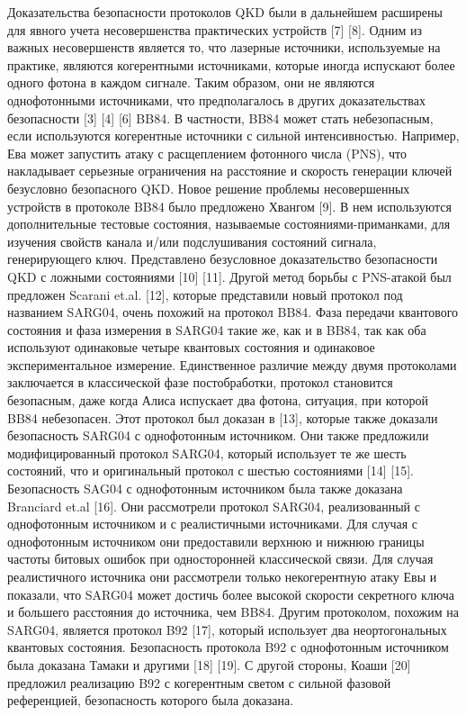 Доказательства безопасности протоколов QKD были в дальнейшем расширены для явного учета несовершенства практических устройств [7] [8]. Одним из важных несовершенств является то, что лазерные источники, используемые на практике, являются когерентными источниками, которые иногда испускают более одного фотона в каждом сигнале. Таким образом, они не являются однофотонными источниками, что предполагалось в других доказательствах безопасности [3] [4] [6] BB84. В частности, BB84 может стать небезопасным, если используются когерентные источники с сильной интенсивностью. Например, Ева может запустить атаку с расщеплением фотонного числа (PNS), что накладывает серьезные ограничения на расстояние и скорость генерации ключей безусловно безопасного QKD. Новое решение проблемы несовершенных устройств в протоколе BB84 было предложено Хвангом [9]. В нем используются дополнительные тестовые состояния, называемые состояниями-приманками, для изучения свойств канала и/или подслушивания состояний сигнала, генерирующего ключ. Представлено безусловное доказательство безопасности QKD с ложными состояниями [10] [11]. Другой метод борьбы с PNS-атакой был предложен Scarani et.al. [12], которые представили новый протокол под названием SARG04, очень похожий на протокол BB84. Фаза передачи квантового состояния и фаза измерения в SARG04 такие же, как и в BB84, так как оба используют одинаковые четыре квантовых состояния и одинаковое экспериментальное измерение. Единственное различие между двумя протоколами заключается в классической фазе постобработки, протокол становится безопасным, даже когда Алиса испускает два фотона, ситуация, при которой BB84 небезопасен. Этот протокол был доказан в [13], которые также доказали безопасность SARG04 с однофотонным источником. Они также предложили модифицированный протокол SARG04, который использует те же шесть состояний, что и оригинальный протокол с шестью состояниями [14] [15]. Безопасность SAG04 с однофотонным источником была также доказана Branciard et.al [16]. Они рассмотрели протокол SARG04, реализованный с однофотонным источником и с реалистичными источниками. Для случая с однофотонным источником они предоставили верхнюю и нижнюю границы частоты битовых ошибок при односторонней классической связи. Для случая реалистичного источника они рассмотрели только некогерентную атаку Евы и показали, что SARG04 может достичь более высокой скорости секретного ключа и большего расстояния до источника, чем BB84. Другим протоколом, похожим на SARG04, является протокол B92 [17], который использует два неортогональных квантовых состояния. Безопасность протокола B92 с однофотонным источником была доказана Тамаки и другими [18] [19]. С другой стороны, Коаши [20] предложил реализацию B92 с когерентным светом с сильной фазовой референцией, безопасность которого была доказана.

